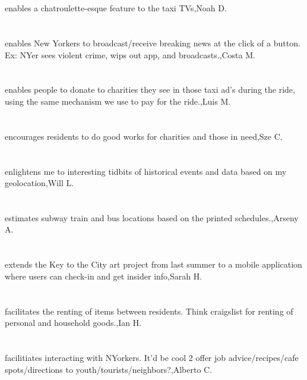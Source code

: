 \section{}enables a chatroulette-esque feature to the taxi TVs,Noah D.	
\section{}enables New Yorkers to broadcast/receive  breaking news at the click of a button. Ex: NYer sees violent crime, wips out app, and broadcasts.,Costa M.
\section{}enables people to donate to charities they see in those taxi ad's during the ride, using the same mechanism we use to pay for the ride.,Luis M.
\section{}encourages residents to do good works for charities and those in need,Sze C.
\section{}enlightens me to interesting tidbits of historical events and data based on my geolocation,Will L.
\section{}estimates subway train and bus locations based on the printed schedules.,Arseny A.
\section{}extends the Key to the City art project from last summer to a mobile application where users can check-in and get insider info,Sarah H.
\section{}facilitates the renting of items between residents. Think  craigslist for renting of personal and household goods.,Ian H.
\section{} facilitiates interacting with NYorkers. It'd be cool 2 offer job advice/recipes/cafe spots/directions to youth/tourists/neighbors?,Alberto C.
